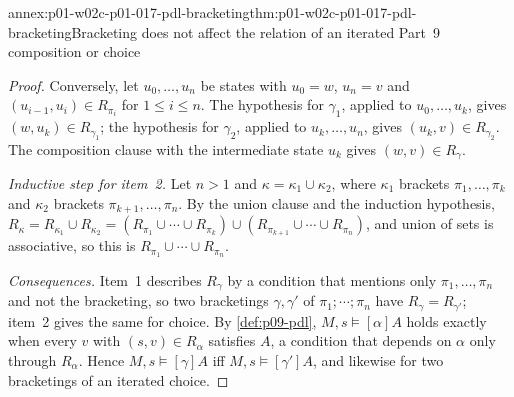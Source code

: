 \begin{annexitem}{annex:p01-w02c-p01-017-pdl-bracketing}{thm:p01-w02c-p01-017-pdl-bracketing}{Bracketing does not affect the relation of an iterated Part~9 composition or choice}
\begin{proof}
Conversely, let \(u_0,\ldots,u_n\) be states with \(u_0=w\), \(u_n=v\) and
\((u_{i-1},u_i)\in R_{\pi_i}\) for \(1\leq i\leq n\).  The hypothesis for
\(\gamma_1\), applied to \(u_0,\ldots,u_k\), gives
\((w,u_k)\in R_{\gamma_1}\); the hypothesis for \(\gamma_2\), applied to
\(u_k,\ldots,u_n\), gives \((u_k,v)\in R_{\gamma_2}\).  The composition
clause with the intermediate state \(u_k\) gives \((w,v)\in R_\gamma\).

\emph{Inductive step for item~2.}  Let \(n>1\) and
\(\kappa=\kappa_1\cup\kappa_2\), where \(\kappa_1\) brackets
\(\pi_1,\ldots,\pi_k\) and \(\kappa_2\) brackets
\(\pi_{k+1},\ldots,\pi_n\).  By the union clause and the induction
hypothesis,
\(R_\kappa=R_{\kappa_1}\cup R_{\kappa_2}
=(R_{\pi_1}\cup\cdots\cup R_{\pi_k})\cup(R_{\pi_{k+1}}\cup\cdots\cup R_{\pi_n})\),
and union of sets is associative, so this is
\(R_{\pi_1}\cup\cdots\cup R_{\pi_n}\).

\emph{Consequences.}  Item~1 describes \(R_\gamma\) by a condition that
mentions only \(\pi_1,\ldots,\pi_n\) and not the bracketing, so two
bracketings \(\gamma,\gamma'\) of \(\pi_1;\cdots;\pi_n\) have
\(R_\gamma=R_{\gamma'}\); item~2 gives the same for choice.  By
\cref{def:p09-pdl}, \(M,s\models[\alpha]A\) holds exactly when every
\(v\) with \((s,v)\in R_\alpha\) satisfies \(A\), a condition that depends
on \(\alpha\) only through \(R_\alpha\).  Hence
\(M,s\models[\gamma]A\) iff \(M,s\models[\gamma']A\), and likewise for two
bracketings of an iterated choice.
\end{proof}
\end{annexitem}

